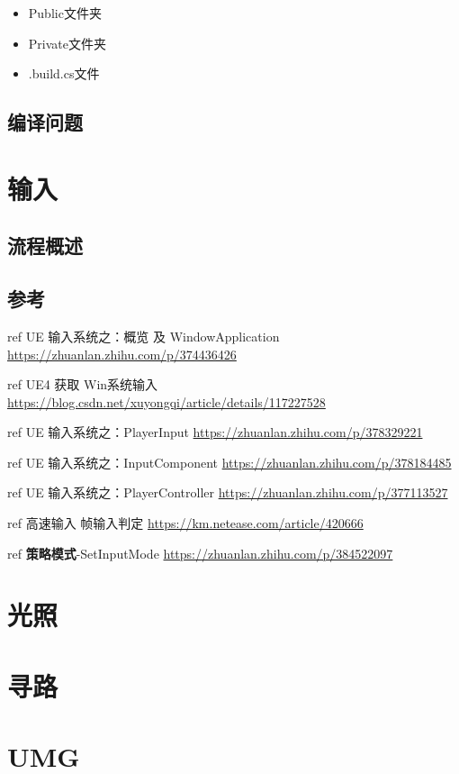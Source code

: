 \documentclass[UTF8,a4paper,12pt]{ctexbook}
\begin{document}
		\begin{itemize}
			\item Public文件夹 
			\item Private文件夹 
			\item .build.cs文件
		\end{itemize}
	
	\section{编译问题}
	
	
\chapter{输入}
	\section{流程概述}
	
	
	\section{参考}
		ref UE 输入系统之：概览 及 WindowApplication \url{https://zhuanlan.zhihu.com/p/374436426}
			
		ref UE4 获取 Win系统输入 \url{https://blog.csdn.net/xuyongqi/article/details/117227528}
		
		ref UE 输入系统之：PlayerInput \url{https://zhuanlan.zhihu.com/p/378329221}
		
		ref UE 输入系统之：InputComponent \url{https://zhuanlan.zhihu.com/p/378184485}
		
		ref UE 输入系统之：PlayerController \url{https://zhuanlan.zhihu.com/p/377113527}
		
		ref 高速输入 帧输入判定 \url{https://km.netease.com/article/420666}
		
		ref \textbf{策略模式}-SetInputMode \url{https://zhuanlan.zhihu.com/p/384522097}
		
		
\chapter{光照}
	
	
	
	
	
\chapter{寻路}
	
	
	
	
\chapter{UMG}
\end{document}
